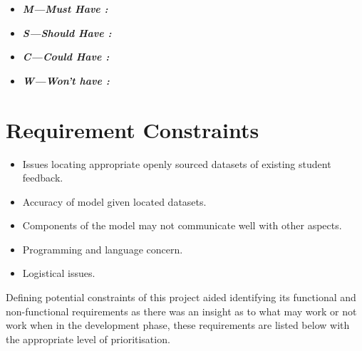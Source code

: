 \begin{itemize}
    \item \textbf{\textit{M---Must Have   :}}
    \item \textbf{\textit{S---Should Have :}}
    \item \textbf{\textit{C---Could Have  :}}
    \item \textbf{\textit{W---Won't have  :}}
\end{itemize}

\section{Requirement Constraints}

\begin{itemize}
    \item Issues locating appropriate openly sourced datasets of existing student feedback.
    \item Accuracy of model given located datasets.
    \item Components of the model may not communicate well with other aspects.
    \item Programming and language concern.
    \item Logistical issues.
\end{itemize}

Defining potential constraints of this project aided identifying its functional and non-functional requirements as there was an insight as to what may work or not work when in the development phase, these requirements are listed below with the appropriate level of prioritisation.

